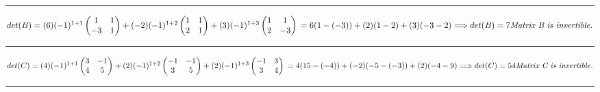 \documentclass[fleqn]{article}
\begin{document}
\begin{enumerate}
    \rule{16cm}{0.4pt}

    \textcolor{hwColor}{
      $
        det(B)=
        (6)(-1)^{1+1}
        \begin{pmatrix}
          1 & 1 \\ 
          -3 & 1
        \end{pmatrix}
        +
        (-2)(-1)^{1+2}
        \begin{pmatrix}
          1 & 1 \\ 
          2 & 1
        \end{pmatrix}
        +
        (3)(-1)^{1+3}
        \begin{pmatrix}
          1 & 1 \\ 
          2 & -3
        \end{pmatrix} \\
        = 6(1-(-3))+(2)(1-2)+(3)(-3-2) \\
        \Longrightarrow det(B)=7 \\
        \emph{Matrix B is invertible.}
      $
    }

    \rule{16cm}{0.4pt}

    \textcolor{hwColor}{
      $
        det(C)=
          (4)(-1)^{1+1}
          \begin{pmatrix}
            3 & -1 \\ 
            4 & 5
          \end{pmatrix}
          +
          (2)(-1)^{1+2}
          \begin{pmatrix}
            -1 & -1 \\ 
            3 & 5
          \end{pmatrix}
          +
          (2)(-1)^{1+3}
          \begin{pmatrix}
            -1 & 3 \\ 
            3 & 4
          \end{pmatrix} \\
        = 4(15-(-4))+(-2)(-5-(-3))+(2)(-4-9) \\
        \Longrightarrow det(C)= 54 \\
        \emph{Matrix C is invertible.}
      $
    }

    \rule{16cm}{0.4pt}


\end{enumerate}
\end{document}
